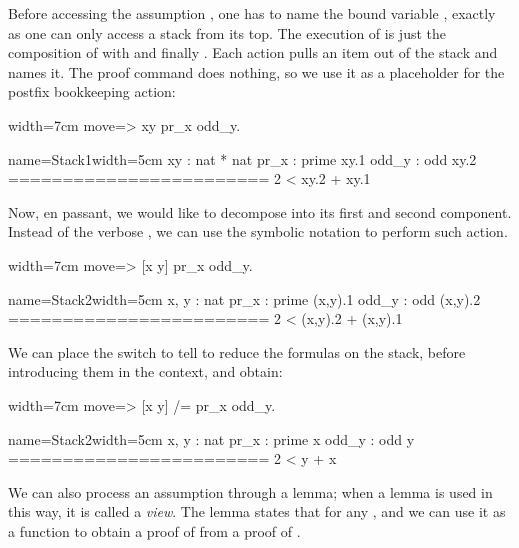 Before accessing the assumption , one has to name the
bound variable , exactly as one can only access a stack from its top.
The execution of  is just the composition of
 with  and finally .  Each action
pulls an item out of the stack and names it.  The  proof
command does nothing, so we use it as a placeholder
for the postfix \C{=>} bookkeeping action:

\begin{coq-left}{}{width=7cm}
move=> xy pr_x odd_y.
$~$
$~$
$~$
$~$
\end{coq-left}
\begin{coqout-right}{name=Stack1}{width=5cm}
 xy : nat * nat
 pr_x : prime xy.1
 odd_y : odd xy.2
========================
 2 < xy.2 + xy.1
\end{coqout-right}

Now, en passant, we would like to decompose  into its first
and second component.  Instead of the verbose ,
we can use the symbolic notation \C{[]} to perform such action.

\begin{coq-left}{}{width=7cm}
move=> [x y] pr_x odd_y.
$~$
$~$
$~$
$~$
\end{coq-left}
\begin{coqout-right}{name=Stack2}{width=5cm}
 x, y : nat
 pr_x : prime (x,y).1
 odd_y : odd (x,y).2
========================
 2 < (x,y).2 + (x,y).1
\end{coqout-right}

We can place the \C{/=} switch to tell \Coq{} to reduce the formulas on
the stack, before introducing them in the context, and obtain:

\begin{coq-left}{}{width=7cm}
move=> [x y] /= pr_x odd_y.
$~$
$~$
$~$
$~$
\end{coq-left}
\begin{coqout-right}{name=Stack2}{width=5cm}
 x, y : nat
 pr_x : prime x
 odd_y : odd y
========================
 2 < y + x
\end{coqout-right}

We can also process an assumption through a lemma; when a lemma is
used in this way, it is called a \emph{view}. 
The
 lemma states that  for any , and we can
use it as a function to obtain a proof of   from a proof
of .


